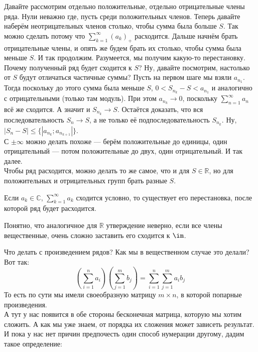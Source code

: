 \documentclass{article}
\begin{document}
\begin{itemize}
\begin{Proof}
            Давайте рассмотрим отдельно положительные, отдельно отрицательные члены ряда. Нули неважно где, пусть среди положительных членов. Теперь давайте наберём неотрицательных членов столько, чтобы сумма была больше $S$. Так можно сделать потому что $\sum\limits_{k=1}^\infty (a_k)_+$ расходится. Дальше начнём брать отрицательные члены, и опять же будем брать их столько, чтобы сумма была меньше $S$. И так продолжим. Разумеется, мы получим какую-то перестановку. Почему полученный ряд будет сходится к $S$? Ну, давайте посмотрим, настолько от $S$ будут отличаться частичные суммы? Пусть на первом шаге мы взяли $a_{n_1}$. Тогда поскольку до этого сумма была меньше $S$, $0<S_{n_k}-S<a_{n_1}$ и аналогично с отрицательными (только там модуль). При этом $a_{n_k}\to0$, поскольку $\sum\limits_{n=1}^\infty a_n$ всё же сходится. А значит и $S_{n_k}\to S$. Остаётся доказать, что вся последовательность $S_n\to S$, а не только её подпоследовательность $S_{n_k}$. Ну, $|S_n-S|\leqslant\{|a_{n_k};a_{n_{k+1}}|\}$.\\
            С $\pm\infty$ можно делать похоже --- берём положительные до единицы, один отрицательный --- потом положительные до двух, один отрицательный. И так далее.\\
            Чтобы ряд расходится, можно делать то же самое, что и для $S\in\mathbb R$, но для положительных и отрицательных групп брать разные $S$.
        \end{Proof}
        \thm Если $a_k\in\mathbb C$, $\sum\limits_{k=1}^\infty a_k$ сходится условно, то существует его перестановка, после которой ряд будет расходится.
        \begin{Comment}
            Понятно, что аналогичное для $\mathbb R$ утверждение неверно, если все члены вещественные, очень сложно заставить его сходится к $\im$.
        \end{Comment}
        \begin{Comment}
            Что делать с произведением рядов? Как мы в вещественном случае это делали? Вот так:
            $$
            \left(\sum\limits_{i=1}^n a_i\right)\left(\sum\limits_{j=1}^m b_j\right)=\sum\limits_{i=1}^n\sum\limits_{j=1}^ma_ib_j
            $$
            То есть по сути мы имели своеобразную матрицу $m\times n$, в которой попарные произведения.\\
            А тут у нас появится в обе стороны бесконечная матрица, которую мы хотим сложить. А как мы уже знаем, от порядка их сложения может зависеть результат. И пока у нас нет причин предпочесть один способ нумерации другому, дадим такое определение:

\end{Comment}
\end{itemize}
\end{document}

